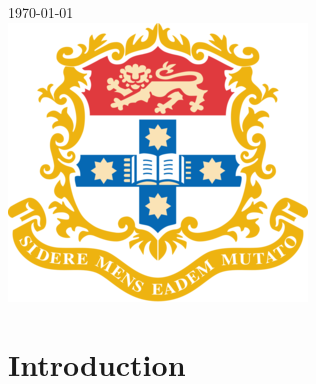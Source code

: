 \begin{titlepage}


{\large \today}\\[2cm] %


\includegraphics{logo.png}\\[1cm] %
 

\vfill %

\end{titlepage}

\tableofcontents
\vfill

\newpage



\section{Introduction}

